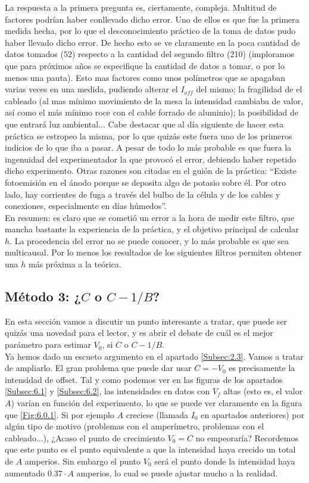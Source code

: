 \documentclass[12pt,a4paper]{article}
\numberwithin{equation}{section}
\numberwithin{table}{section}
\numberwithin{figure}{section}
\begin{document}
La respuesta a la primera pregunta es, ciertamente, compleja. Multitud de factores podrían haber conllevado dicho error. Uno de ellos es que fue la primera medida hecha, por lo que el desconocimiento práctico de la toma de datos pudo haber llevado dicho error. De hecho esto se ve claramente en la poca cantidad de datos tomados (52) respecto a la cantidad del segundo filtro (210) (imploramos que para próximos años se especifique la cantidad de datos a tomar, o por lo menos una pauta). Esto mas factores como unos polímetros que se apagaban varias veces en una medida, pudiendo alterar el $I_{off}$ del mismo; la fragilidad de el cableado (al mas mínimo movimiento de la mesa la intensidad cambiaba de valor, así como el más mínimo roce con el cable forrado de aluminio); la posibilidad de que entrará luz ambiental... Cabe destacar que al día siguiente de hacer esta práctica se estropeo la misma, por lo que quizás este fuera uno de los primeros indicios de lo que iba a pasar. A pesar de todo lo más probable es que fuera la ingenuidad del experimentador la que provocó el error, debiendo haber repetido dicho experimento. Otras razones son citadas en el guión de la práctica: ``Existe fotoemisión en el ánodo porque se deposita algo de potasio sobre él. Por otro lado, hay corrientes de fuga a través del bulbo de la célula y de los cables y conexiones, especialmente en días húmedos''. \\

En resumen: es claro que se cometió un error a la hora de medir este filtro, que mancha bastante la experiencia de la práctica, y el objetivo principal de calcular $h$. La procedencia del error no se puede conocer, y lo más probable es que sea multicausal. Por lo menos los resultados de los siguientes filtros permiten obtener una $h$ más próxima a la teórica. 

\subsection{Método 3: ¿$C$ o $C-1/B$?}

En esta sección vamos a discutir un punto interesante a tratar, que puede ser quizás una novedad para el lector, y es abrir el debate de cuál es el mejor parámetro para estimar $V_0$, si $C$ o $C-1/B$. \\

Ya hemos dado un escueto argumento en el apartado \ref{Subsec:2.3}. Vamos a tratar de ampliarlo. El gran problema que puede dar usar $C=-V_0$ es precisamente la intensidad de offset. Tal y como podemos ver en las figuras de los apartados \ref{Subsec:6.1} y \ref{Subsec:6.2}, las intensidades en datos con $V_f$ altas (esto es, el valor $A$) varían en función del experimento, lo que se puede ver claramente en la figura que \ref{Fig:6.0.1}. Si por ejemplo $A$ creciese (llamada $I_0$ en apartados anteriores) por algún tipo de motivo (problemas con el amperímetro, problemas con el cableado...), ¿Acaso el punto de crecimiento $V_0 = C$ no empeoraría? Recordemos que este punto es el punto equivalente a que la intensidad haya crecido un total de $A$ amperios. Sin embargo el punto $V_0$ será el punto donde la intensidad haya aumentado $0.37 \cdot A$ amperios, lo cual se puede ajustar mucho a la realidad. \\
\end{document}
